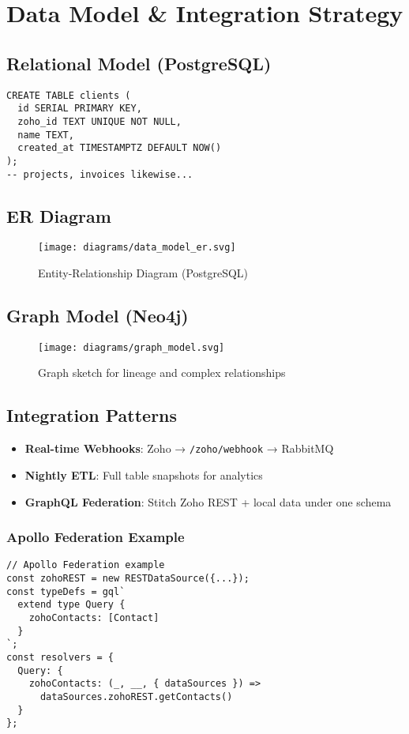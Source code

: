 \section{Data Model \& Integration Strategy}

\subsection{Relational Model (PostgreSQL)}
\begin{verbatim}
CREATE TABLE clients (
  id SERIAL PRIMARY KEY,
  zoho_id TEXT UNIQUE NOT NULL,
  name TEXT,
  created_at TIMESTAMPTZ DEFAULT NOW()
);
-- projects, invoices likewise...
\end{verbatim}

\subsection{ER Diagram}
\begin{figure}[h]
  \centering
  \texttt{[image: diagrams/data\_model\_er.svg]}
  \caption{Entity-Relationship Diagram (PostgreSQL)}
\end{figure}

\subsection{Graph Model (Neo4j)}
\begin{figure}[h]
  \centering
  \texttt{[image: diagrams/graph\_model.svg]}
  \caption{Graph sketch for lineage and complex relationships}
\end{figure}

\subsection{Integration Patterns}
\begin{itemize}
  \item \textbf{Real-time Webhooks}: Zoho → \texttt{/zoho/webhook} → RabbitMQ
  \item \textbf{Nightly ETL}: Full table snapshots for analytics
  \item \textbf{GraphQL Federation}: Stitch Zoho REST + local data under one schema
\end{itemize}

\subsubsection{Apollo Federation Example}
\begin{verbatim}
// Apollo Federation example
const zohoREST = new RESTDataSource({...});
const typeDefs = gql`
  extend type Query {
    zohoContacts: [Contact]
  }
`;
const resolvers = {
  Query: { 
    zohoContacts: (_, __, { dataSources }) => 
      dataSources.zohoREST.getContacts() 
  }
};
\end{verbatim} 

